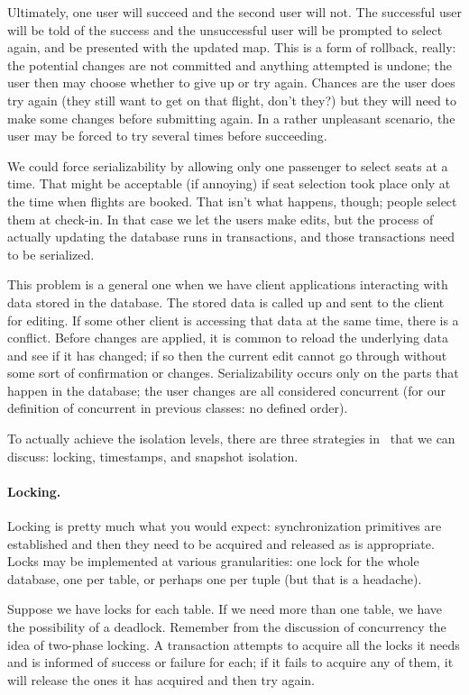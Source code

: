 \documentclass[a4paper]{report}
\begin{document}
Ultimately, one user will succeed and the second user will not. The successful user will be told of the success and the unsuccessful user will be prompted to select again, and be presented with the updated map. This is a form of rollback, really: the potential changes are not committed and anything attempted is undone; the user then may choose whether to give up or try again. Chances are the user does try again (they still want to get on that flight, don't they?) but they will need to make some changes before submitting again. In a rather unpleasant scenario, the user may be forced to try several times before succeeding.

We could force serializability by allowing only one passenger to select seats at a time. That might be acceptable (if annoying) if seat selection took place only at the time when flights are booked. That isn't what happens, though; people select them at check-in. In that case we let the users make edits, but the process of actually updating the database runs in transactions, and those transactions need to be serialized. 

This problem is a general one when we have client applications interacting with data stored in the database. The stored data is called up and sent to the client for editing. If some other client is accessing that data at the same time, there is a conflict. Before changes are applied, it is common to reload the underlying data and see if it has changed; if so then the current edit cannot go through without some sort of confirmation or changes. Serializability occurs only on the parts that happen in the database; the user changes are all considered concurrent (for our definition of concurrent in previous classes: no defined order).

To actually achieve the isolation levels, there are three strategies in~\cite{dsc} that we can discuss: locking, timestamps, and snapshot isolation.

\paragraph{Locking.} Locking is pretty much what you would expect: synchronization primitives are established and then they need to be acquired and released as is appropriate. Locks may be implemented at various granularities: one lock for the whole database, one per table, or perhaps one per tuple (but that is a headache). 

Suppose we have locks for each table. If we need more than one table, we have the possibility of a deadlock. Remember from the discussion of concurrency the idea of two-phase locking. A transaction attempts to acquire all the locks it needs and is informed of success or failure for each; if it fails to acquire any of them, it will release the ones it has acquired and then try again. 
\end{document}
